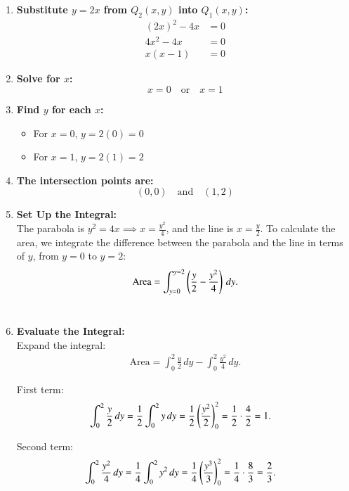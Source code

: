 \documentclass[journal]{IEEEtran}
\begin{document}
\begin{enumerate}
    \item \textbf{Substitute \( y = 2x \) from \( Q_2(x, y) \) into \( Q_1(x, y) \):}
    \begin{align}
    (2x)^2 - 4x &= 0 \\
    4x^2 - 4x &= 0 \\
    x(x - 1) &= 0
    \end{align}

    \item \textbf{Solve for \( x \):}
    \[
    x = 0 \quad \text{or} \quad x = 1
    \]

    \item \textbf{Find \( y \) for each \( x \):}
    \begin{itemize}
        \item For \( x = 0 \), \( y = 2(0) = 0 \)
        \item For \( x = 1 \), \( y = 2(1) = 2 \)
    \end{itemize}

    \item \textbf{The intersection points are:}
    \[
    (0, 0) \quad \text{and} \quad (1, 2)
    \]


    \item \textbf{Set Up the Integral:}  \\
    The parabola is $y^2 = 4x \implies x = \frac{y^2}{4}$, and the line is $x = \frac{y}{2}$.  
    To calculate the area, we integrate the difference between the parabola and the line in terms of $y$, from $y = 0$ to $y = 2$:
    \begin{align}
        \text{Area} = \int_{y=0}^{y=2} \left( \frac{y}{2} - \frac{y^2}{4} \right) \, dy.
    \end{align} \\

    \item \textbf{Evaluate the Integral:}  \\
    Expand the integral:
    \begin{align}
        \text{Area} = \int_{0}^{2} \frac{y}{2} \, dy - \int_{0}^{2} \frac{y^2}{4} \, dy.
    \end{align}

    First term:
    \begin{align}
        \int_{0}^{2} \frac{y}{2} \, dy &= \frac{1}{2} \int_{0}^{2} y \, dy = \frac{1}{2} \left( \frac{y^2}{2} \right)_{0}^{2} = \frac{1}{2} \cdot \frac{4}{2} = 1.
    \end{align}

    Second term:
    \begin{align}
        \int_{0}^{2} \frac{y^2}{4} \, dy &= \frac{1}{4} \int_{0}^{2} y^2 \, dy = \frac{1}{4} \left( \frac{y^3}{3} \right)_{0}^{2} = \frac{1}{4} \cdot \frac{8}{3} = \frac{2}{3}.
    \end{align}


\end{enumerate}
\end{document}
